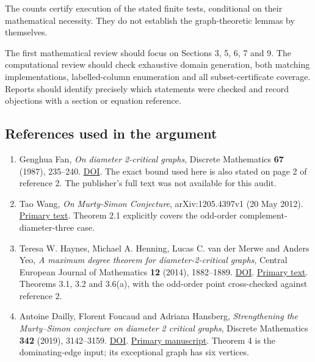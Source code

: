 \documentclass[
  11pt,
]{article}
\providecommand{\tightlist}{%
  \setlength{\itemsep}{0pt}\setlength{\parskip}{0pt}}
\begin{document}
The counts certify execution of the stated finite tests, conditional on
their mathematical necessity. They do not establish the graph-theoretic
lemmas by themselves.

The first mathematical review should focus on Sections 3, 5, 6, 7 and 9.
The computational review should check exhaustive domain generation, both
matching implementations, labelled-column enumeration and all
subset-certificate coverage. Reports should identify precisely which
statements were checked and record objections with a section or equation
reference.

\hypertarget{references-used-in-the-argument}{%
\subsection{References used in the
argument}\label{references-used-in-the-argument}}

\begin{enumerate}
\def\labelenumi{\arabic{enumi}.}
\tightlist
\item
  Genghua Fan, \emph{On diameter 2-critical graphs}, Discrete
  Mathematics \textbf{67} (1987), 235--240.
  \href{https://doi.org/10.1016/0012-365X(87)90174-9}{DOI}. The exact
  bound used here is also stated on page 2 of reference 2. The
  publisher's full text was not available for this audit.
\item
  Tao Wang, \emph{On Murty-Simon Conjecture}, arXiv:1205.4397v1 (20 May
  2012). \href{https://arxiv.org/pdf/1205.4397v1}{Primary text}. Theorem
  2.1 explicitly covers the odd-order complement-diameter-three case.
\item
  Teresa W. Haynes, Michael A. Henning, Lucas C. van der Merwe and
  Anders Yeo, \emph{A maximum degree theorem for diameter-2-critical
  graphs}, Central European Journal of Mathematics \textbf{12} (2014),
  1882--1889. \href{https://doi.org/10.2478/s11533-014-0449-3}{DOI}.
  \href{https://d-nb.info/1372516379/34}{Primary text}. Theorems 3.1,
  3.2 and 3.6(a), with the odd-order point cross-checked against
  reference 2.
\item
  Antoine Dailly, Florent Foucaud and Adriana Hansberg,
  \emph{Strengthening the Murty--Simon conjecture on diameter 2 critical
  graphs}, Discrete Mathematics \textbf{342} (2019), 3142--3159.
  \href{https://doi.org/10.1016/j.disc.2019.06.023}{DOI}.
  \href{https://arxiv.org/pdf/1812.08420}{Primary manuscript}. Theorem 4
  is the dominating-edge input; its exceptional graph has six vertices.
\end{enumerate}
\end{document}

